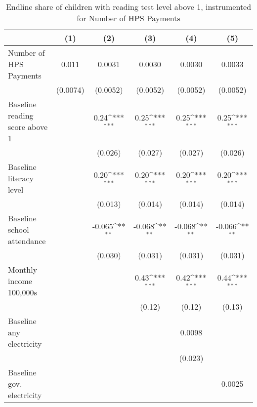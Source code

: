 \begin{table}[htbp]\centering
\def\sym#1{\ifmmode^{#1}\else\(^{#1}\)\fi}
\caption{Endline share of children with reading test level above 1, instrumented for Number of HPS Payments}
\begin{tabular*}{1\hsize}{@{\hskip\tabcolsep\extracolsep\fill}l*{5}{c}}
\toprule
                &\multicolumn{1}{c}{(1)}         &\multicolumn{1}{c}{(2)}         &\multicolumn{1}{c}{(3)}         &\multicolumn{1}{c}{(4)}         &\multicolumn{1}{c}{(5)}         \\
\midrule
Number of HPS Payments&    0.011         &   0.0031         &   0.0030         &   0.0030         &   0.0033         \\
                & (0.0074)         & (0.0052)         & (0.0052)         & (0.0052)         & (0.0052)         \\
Baseline reading score above 1&                  &     0.24\sym{***}&     0.25\sym{***}&     0.25\sym{***}&     0.25\sym{***}\\
                &                  &  (0.026)         &  (0.027)         &  (0.027)         &  (0.026)         \\
Baseline literacy level&                  &     0.20\sym{***}&     0.20\sym{***}&     0.20\sym{***}&     0.20\sym{***}\\
                &                  &  (0.013)         &  (0.014)         &  (0.014)         &  (0.014)         \\
Baseline school attendance&                  &   -0.065\sym{**} &   -0.068\sym{**} &   -0.068\sym{**} &   -0.066\sym{**} \\
                &                  &  (0.030)         &  (0.031)         &  (0.031)         &  (0.031)         \\
Monthly income 100,000s&                  &                  &     0.43\sym{***}&     0.42\sym{***}&     0.44\sym{***}\\
                &                  &                  &   (0.12)         &   (0.12)         &   (0.13)         \\
Baseline any electricity&                  &                  &                  &   0.0098         &                  \\
                &                  &                  &                  &  (0.023)         &                  \\
Baseline gov. electricity&                  &                  &                  &                  &   0.0025         \\

\end{tabular*}
\end{table}
